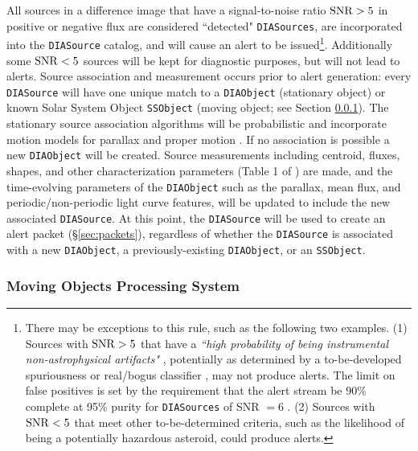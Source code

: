 All sources in a difference image that have a signal-to-noise ratio ${\rm SNR}>5$ in positive or negative flux are considered ``detected" \texttt{DIASources}, are incorporated into the {\tt DIASource} catalog, and will cause an alert to be issued\footnote{
There may be exceptions to this rule, such as the following two examples.
(1) Sources with ${\rm SNR} > 5$ that have a {\it ``high probability of being instrumental non-astrophysical artifacts"} , potentially as determined by
a to-be-developed spuriousness or real/bogus classifier , may not produce alerts.
The limit on false positives is set by the requirement that the alert stream be 90\% complete at 95\% purity for \texttt{DIASources} of SNR $= 6$ .
(2) Sources with ${\rm SNR} < 5$ that meet other to-be-determined criteria, such as the likelihood of being a potentially hazardous asteroid, could produce alerts.}.
Additionally some ${\rm SNR} < 5$ sources will be kept for diagnostic purposes, but will not lead to alerts.
Source association and measurement occurs prior to alert generation: every {\tt DIASource} will have one unique match to a {\tt DIAObject} (stationary object) or known Solar System Object {\tt SSObject} (moving object; see Section \ref{sec:AGP_MOPS}).
The stationary source association algorithms will be probabilistic and incorporate motion models for parallax and proper motion .
If no association is possible a new {\tt DIAObject} will be created.
Source measurements including centroid, fluxes, shapes, and other characterization parameters (Table 1 of ) are made, and the time-evolving parameters of the {\tt DIAObject} such as the parallax, mean flux, and periodic/non-periodic light curve features, will be updated to include the new associated {\tt DIASource}.
At this point, the {\tt DIASource} will be used to create an alert packet (\S \ref{sec:packets}), regardless of whether the \texttt{DIASource} is associated with a new \texttt{DIAObject}, a previously-existing \texttt{DIAObject}, or an \texttt{SSObject}.

\subsubsection{Moving Objects Processing System}\label{sec:AGP_MOPS}

